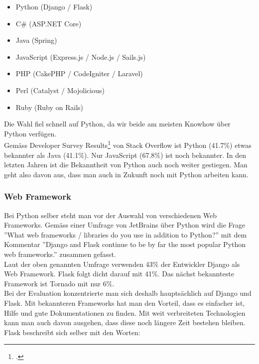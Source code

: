 
\begin{itemize}
	\item Python (Django / Flask)
	\item C\# (ASP.NET Core)
	\item Java (Spring)
	\item JavaScript (Express.js / Node.js / Sails.js)
	\item PHP (CakePHP / CodeIgniter / Laravel)
	\item Perl (Catalyst / Mojolicious)
	\item Ruby (Ruby on Rails)
\end{itemize}


Die Wahl fiel schnell auf Python, da wir beide am meisten Knowhow über Python verfügen. \\
Gemäss Developer Survey Results\footcite{developer_survey_results} von Stack Overflow ist Python (41.7\%) etwas bekannter als Java (41.1\%). Nur JavaScript (67.8\%) ist noch bekannter. In den letzten Jahren ist die Bekanntheit von Python auch noch weiter gestiegen. Man geht also davon aus, dass man auch in Zukunft noch mit Python arbeiten kann.


\subsubsection*{Web Framework}
Bei Python selber steht man vor der Auswahl von verschiedenen Web Frameworks. Gemäss einer Umfrage von JetBrains über Python wird die Frage ''What web frameworks / libraries do you use in addition to Python?'' mit dem Kommentar ''Django and Flask continue to be by far the most popular Python web frameworks.'' zusammen gefasst. \\
Laut der oben genannten Umfrage verwenden 43\% der Entwickler  Django als Web Framework. Flask folgt dicht darauf mit 41\%. Das nächst bekannteste Framework ist Tornado mit nur 6\%. \\
Bei der Evaluation konzentrierte man sich deshalb hauptsächlich auf Django und Flask. Mit bekannteren Frameworks hat man den Vorteil, dass es einfacher ist, Hilfe und gute Dokumentationen zu finden. Mit weit verbreiteten Technologien kann man auch davon ausgehen, dass diese noch längere Zeit bestehen bleiben.  \\ 

Flask beschreibt sich selber mit den Worten:

